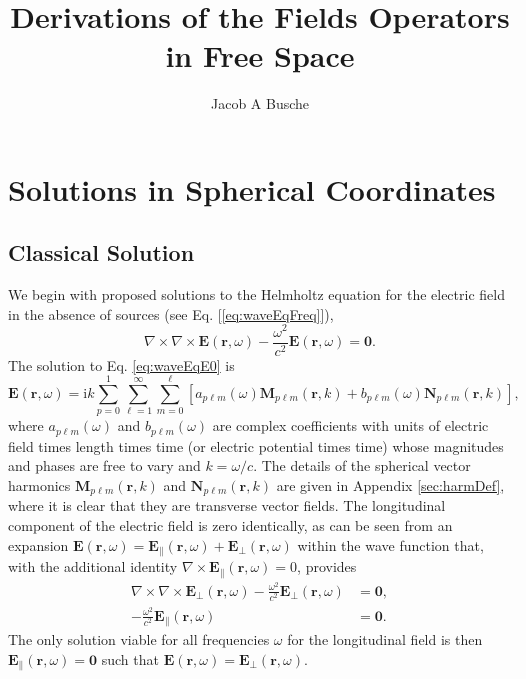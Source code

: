 \documentclass{article}
\numberwithin{equation}{section}
\begin{document}
\title{Derivations of the Fields Operators in Free Space}
\author{Jacob A Busche}

\maketitle




\section{Solutions in Spherical Coordinates}

\subsection{Classical Solution}

We begin with proposed solutions to the Helmholtz equation for the electric field in the absence of sources (see Eq. [\ref{eq:waveEqFreq}]),
\begin{equation}\label{eq:waveEqE0}
\nabla\times\nabla\times\mathbf{E}(\mathbf{r},\omega) - \frac{\omega^2}{c^2}\mathbf{E}(\mathbf{r},\omega) = \bm{0}.
\end{equation}
The solution to Eq. \eqref{eq:waveEqE0} is
\begin{equation}
\mathbf{E}(\mathbf{r},\omega) = \mathrm{i}k\sum_{p = 0}^1\sum_{\ell = 1}^\infty\sum_{m = 0}^\ell\left[a_{p\ell m}(\omega)\mathbf{M}_{p\ell m}(\mathbf{r},k) + b_{p\ell m}(\omega)\mathbf{N}_{p\ell m}(\mathbf{r},k)\right],
\end{equation}
where $a_{p\ell m}(\omega)$ and $b_{p\ell m}(\omega)$ are complex coefficients with units of electric field times length times time (or electric potential times time) whose magnitudes and phases are free to vary and $k = \omega/c$. The details of the spherical vector harmonics $\mathbf{M}_{p\ell m}(\mathbf{r},k)$ and $\mathbf{N}_{p\ell m}(\mathbf{r},k)$ are given in Appendix \ref{sec:harmDef}, where it is clear that they are transverse vector fields. The longitudinal component of the electric field is zero identically, as can be seen from an expansion $\mathbf{E}(\mathbf{r},\omega) = \mathbf{E}_\parallel(\mathbf{r},\omega) + \mathbf{E}_\perp(\mathbf{r},\omega)$ within the wave function that, with the additional identity $\nabla\times\mathbf{E}_\parallel(\mathbf{r},\omega) = 0$, provides
\begin{equation}
\begin{split}
\nabla\times\nabla\times\mathbf{E}_\perp(\mathbf{r},\omega) - \frac{\omega^2}{c^2}\mathbf{E}_\perp(\mathbf{r},\omega) &= \bm{0},\\
-\frac{\omega^2}{c^2}\mathbf{E}_\parallel(\mathbf{r},\omega) &= \bm{0}.
\end{split}
\end{equation}
The only solution viable for all frequencies $\omega$ for the longitudinal field is then $\mathbf{E}_\parallel(\mathbf{r},\omega) = \bm{0}$ such that $\mathbf{E}(\mathbf{r},\omega) = \mathbf{E}_\perp(\mathbf{r},\omega)$.
\end{document}
